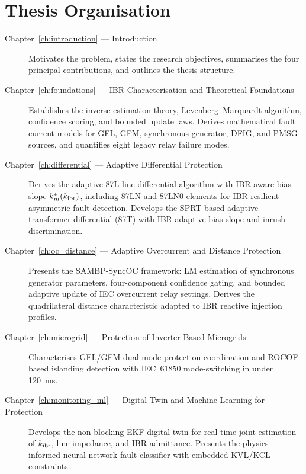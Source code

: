 \section{Thesis Organisation}
\label{sec:ch1_organisation}

\begin{description}
\item[Chapter~\ref{ch:introduction} --- Introduction]
  Motivates the problem, states the research objectives, summarises the
  four principal contributions, and outlines the thesis structure.

\item[Chapter~\ref{ch:foundations} --- IBR Characterisation and Theoretical Foundations]
  Establishes the inverse estimation theory, Levenberg--Marquardt algorithm,
  confidence scoring, and bounded update laws. Derives mathematical fault
  current models for GFL, GFM, synchronous generator, DFIG, and PMSG
  sources, and quantifies eight legacy relay failure modes.

\item[Chapter~\ref{ch:differential} --- Adaptive Differential Protection]
  Derives the adaptive 87L line differential algorithm with IBR-aware bias
  slope $k_m^*(k_\mathrm{ibr})$, including 87LN and 87LN0 elements for IBR-resilient
  asymmetric fault detection. Develops the SPRT-based adaptive transformer
  differential (87T) with IBR-adaptive bias slope and inrush discrimination.

\item[Chapter~\ref{ch:oc_distance} --- Adaptive Overcurrent and Distance Protection]
  Presents the SAMBP-SyncOC framework: LM estimation of synchronous generator
  parameters, four-component confidence gating, and bounded adaptive update of
  IEC overcurrent relay settings. Derives the quadrilateral distance
  characteristic adapted to IBR reactive injection profiles.

\item[Chapter~\ref{ch:microgrid} --- Protection of Inverter-Based Microgrids]
  Characterises GFL/GFM dual-mode protection coordination and ROCOF-based
  islanding detection with IEC~61850 mode-switching in under 120~ms.

\item[Chapter~\ref{ch:monitoring_ml} --- Digital Twin and Machine Learning for Protection]
  Develops the non-blocking EKF digital twin for real-time joint estimation
  of $k_\mathrm{ibr}$, line impedance, and IBR admittance. Presents the physics-informed
  neural network fault classifier with embedded KVL/KCL constraints.


\end{description}
